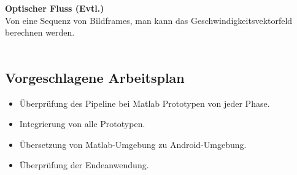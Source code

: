 	\textbf{Optischer Fluss (Evtl.)}\\
	Von eine Sequenz von Bildframes, man kann das Geschwindigkeitsvektorfeld berechnen werden.\\ \\
\subsection*{Vorgeschlagene Arbeitsplan}
	\begin{itemize}
		\item \"Uberpr\"ufung des Pipeline bei Matlab Prototypen von jeder Phase.
		\item Integrierung von alle Prototypen.
		\item \"Ubersetzung von Matlab-Umgebung zu Android-Umgebung.
		\item \"Uberpr\"ufung der Endeanwendung.
	\end{itemize}